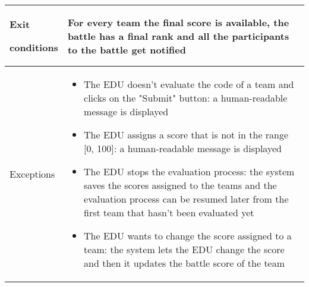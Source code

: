 \begin{center}
\begin{tabular}{| m{2cm} | m{10cm}|}
        Exit \par conditions  & For every team the final score is available, the battle has a final rank and all the participants to the battle get notified                                                                                             \\ \hline
        Exceptions            & \begin{itemize}
                                    \item The EDU doesn't evaluate the code of a team and clicks on the "Submit" button: a human-readable message is displayed
                                    \item The EDU assigns a score that is not in the range [0, 100]: a human-readable message is displayed
                                    \item The EDU stops the evaluation process: the system saves the scores assigned to the teams and the evaluation process can be resumed later from the first team that hasn't been evaluated yet
                                    \item The EDU wants to change the score assigned to a team: the system lets the EDU change the score and then it updates the battle score of the team
                                \end{itemize}                          \\ \hline
    \end{tabular}
\end{center}

